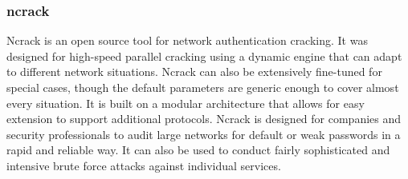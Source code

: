 \documentclass{article}
\begin{document}
\subsubsection{ncrack}
Ncrack is an open source tool for network authentication cracking. It was designed for high-speed parallel cracking using a dynamic engine that can adapt to different network situations. Ncrack can also be extensively fine-tuned for special cases, though the default parameters are generic enough to cover almost every situation. It is built on a modular architecture that allows for easy extension to support additional protocols. Ncrack is designed for companies and security professionals to audit large networks for default or weak passwords in a rapid and reliable way. It can also be used to conduct fairly sophisticated and intensive brute force attacks against individual services.
\end{document}

